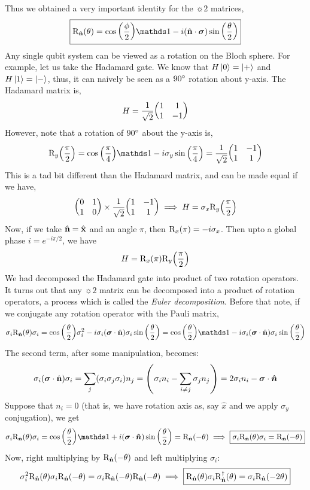 Thus we obtained a very important identity for the $\sun{2}$ matrices, 
$$\boxed{\rn{\hat{\vb{n}}}{\theta} =\cos\qty(\frac{\phi}{2})\iden -i(\hat{\vb{n}}\cdot \vbs{\sigma})\sin\qty(\frac{\theta}{2}) }$$
Any single qubit system can be viewed as a rotation on the Bloch sphere. For example, let us take the Hadamard gate. We know that $H\ket{0}=\ket{+}$ and $H\ket{1} = \ket{-}$, thus, it can naively be seen as a $90\degree$ rotation about y-axis. The Hadamard matrix is,
$$H =\frac{1}{\sqrt{2}} \mqty(1 & 1 \\ 1 & -1)$$
However, note that a rotation of $90\degree$ about the y-axis is, 
$$\rn{y}{\frac{\pi}{2}} = \cos\qty(\frac{\pi}{4}) \iden - i \sigma_y \sin\qty(\frac{\pi}{4}) = \frac{1}{\sqrt{2}}\mqty(1 & -1 \\ 1 & 1)$$
This is a tad bit different than the Hadamard matrix, and can be made equal if we have, 
$$\mqty(0 & 1 \\ 1 & 0)\times\frac{1}{\sqrt{2}}\mqty(1 & -1 \\ 1 & 1) \implies H = \sigma_x \rn{y}{\frac{\pi}{2}}$$
Now, if we take $\hat{\vb{n}} = \hat{\vb{x}}$ and an angle $\pi$, then $\mathrm{R}_{x}\qty(\pi) = -i \sigma_x$. Then upto a global phase $i = e^{-i\pi/2}$, we have 
$$H = \mathrm{R}_{x}\qty(\pi)\mathrm{R}_{y}\qty(\frac{\pi}{2})$$
We had decomposed the Hadamard gate into product of two rotation operators. It turns out that any $\sun{2}$ matrix can be decomposed into a product of rotation operators, a process which is called the \textit{Euler decomposition}. Before that note, if we conjugate any rotation operator with the Pauli matrix, 
$$\sigma_i \rn{\hat{\vb{n}}}{\theta}{\sigma_i} = \cos\qty(\frac{\theta}{2})\sigma_i^2 - i\sigma_i(\vbs{\sigma} \cdot \hat{\vb{n}})\sigma_i \sin\qty(\frac{\theta}{2}) =\cos\qty(\frac{\theta}{2})\iden -i \sigma_i(\vbs{\sigma} \cdot \hat{\vb{n}})\sigma_i \sin\qty(\frac{\theta}{2})$$
The second term, after some manipulation, becomes:
$$\sigma_i(\boldsymbol{\sigma} \cdot \hat{\vb{n}})\sigma_i =\sum_j (\sigma_i \sigma_j \sigma_i) n_j = \qty(\sigma_i n_i - \sum_{i\neq j} \sigma_j  n_j ) =2\sigma_i n_i - \boldsymbol{\sigma}\cdot \boldsymbol{\hat{n}}  $$
Suppose that $n_i = 0$ (that is, we have rotation axis as, say $\hat{x}$ and we apply $\sigma_y$ conjugation), we get 
$$\sigma_i \rn{\hat{\vb{n}}}{\theta}{\sigma_i} = \cos\qty(\frac{\theta}{2})\iden+i(\vbs{\sigma}\cdot \vbs{\hat{n}})\sin\qty(\frac{\theta}{2}) = \rn{\hat{\vb{n}}}{-\theta}\implies \boxed{\sigma_i \rn{\hat{\vb{n}}}{\theta}{\sigma_i} =\rn{\hat{\vb{n}}}{-\theta}} $$
Now, right multiplying by $\mathrm{R}_{\hat{\vb{n}}}\qty(-\theta)$ and left multiplying $\sigma_i$:
$$\sigma_i^2 \mathrm{R}_{\hat{\vb{n}}}\qty(\theta){\sigma_i}\mathrm{R}_{\hat{\vb{n}}}\qty(-\theta) = \sigma_i \mathrm{R}_{\hat{\vb{n}}}\qty(-\theta)\mathrm{R}_{\hat{\vb{n}}}\qty(-\theta)\implies \boxed{ \mathrm{R}_{\hat{\vb{n}}}\qty(\theta){\sigma_i}\mathrm{R}_{\hat{\vb{n}}}^\dagger (\theta) = \sigma_i \mathrm{R}_{\hat{\vb{n}}}\qty(-2\theta)}$$

